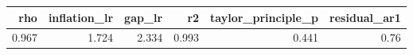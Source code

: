 
\begin{tabular}{rrrrrr}
\toprule
rho & inflation\_lr & gap\_lr & r2 & taylor\_principle\_p & residual\_ar1\\
\midrule
0.967 & 1.724 & 2.334 & 0.993 & 0.441 & 0.76\\
\bottomrule
\end{tabular}
